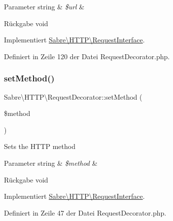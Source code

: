 \begin{DoxyParams}[1]{Parameter}
string & {\em \$url} & \\
\hline
\end{DoxyParams}
\begin{DoxyReturn}{Rückgabe}
void 
\end{DoxyReturn}


Implementiert \mbox{\hyperlink{interface_sabre_1_1_h_t_t_p_1_1_request_interface_a1666fb35c3bad57838f187bf40105be4}{Sabre\textbackslash{}\+H\+T\+T\+P\textbackslash{}\+Request\+Interface}}.



Definiert in Zeile 120 der Datei Request\+Decorator.\+php.

\mbox{\label{class_sabre_1_1_h_t_t_p_1_1_request_decorator_a585f5ca3ea04942eb78b14a16ec48d46}} 
\subsubsection{\texorpdfstring{set\+Method()}{setMethod()}}
{\footnotesize\ttfamily Sabre\textbackslash{}\+H\+T\+T\+P\textbackslash{}\+Request\+Decorator\+::set\+Method (\begin{DoxyParamCaption}\item[{}]{\$method }\end{DoxyParamCaption})}

Sets the H\+T\+TP method


\begin{DoxyParams}[1]{Parameter}
string & {\em \$method} & \\
\hline
\end{DoxyParams}
\begin{DoxyReturn}{Rückgabe}
void 
\end{DoxyReturn}


Implementiert \mbox{\hyperlink{interface_sabre_1_1_h_t_t_p_1_1_request_interface_a91dcec67206436b8439e0256b6388da0}{Sabre\textbackslash{}\+H\+T\+T\+P\textbackslash{}\+Request\+Interface}}.



Definiert in Zeile 47 der Datei Request\+Decorator.\+php.

\mbox{\label{class_sabre_1_1_h_t_t_p_1_1_request_decorator_ac355c936a5f6baddd65c55f8d5d81032}} 

